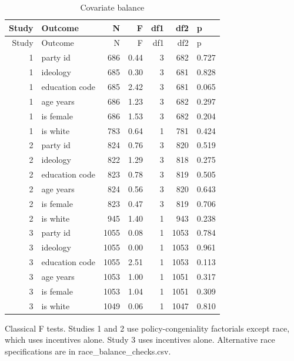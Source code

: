 
\begin{longtable}[t]{rlrrrrl}
\caption{\label{tab:balance}Covariate balance}\\
\toprule
Study & Outcome & N & F & df1 & df2 & p\\
\midrule
\endfirsthead
\toprule
Study & Outcome & N & F & df1 & df2 & p\\
\midrule
\endhead
1 & party id & 686 & 0.44 & 3 & 682 & 0.727\\
1 & ideology & 685 & 0.30 & 3 & 681 & 0.828\\
1 & education code & 685 & 2.42 & 3 & 681 & 0.065\\
1 & age years & 686 & 1.23 & 3 & 682 & 0.297\\
1 & is female & 686 & 1.53 & 3 & 682 & 0.204\\
1 & is white & 783 & 0.64 & 1 & 781 & 0.424\\
2 & party id & 824 & 0.76 & 3 & 820 & 0.519\\
2 & ideology & 822 & 1.29 & 3 & 818 & 0.275\\
2 & education code & 823 & 0.78 & 3 & 819 & 0.505\\
2 & age years & 824 & 0.56 & 3 & 820 & 0.643\\
2 & is female & 823 & 0.47 & 3 & 819 & 0.706\\
2 & is white & 945 & 1.40 & 1 & 943 & 0.238\\
3 & party id & 1055 & 0.08 & 1 & 1053 & 0.784\\
3 & ideology & 1055 & 0.00 & 1 & 1053 & 0.961\\
3 & education code & 1055 & 2.51 & 1 & 1053 & 0.113\\
3 & age years & 1053 & 1.00 & 1 & 1051 & 0.317\\
3 & is female & 1053 & 1.04 & 1 & 1051 & 0.309\\
3 & is white & 1049 & 0.06 & 1 & 1047 & 0.810\\
\bottomrule
\end{longtable}
\noindent\footnotesize Classical F tests. Studies 1 and 2 use policy-congeniality factorials except race, which uses incentives alone. Study 3 uses incentives alone. Alternative race specifications are in race\_balance\_checks.csv.\par\normalsize
